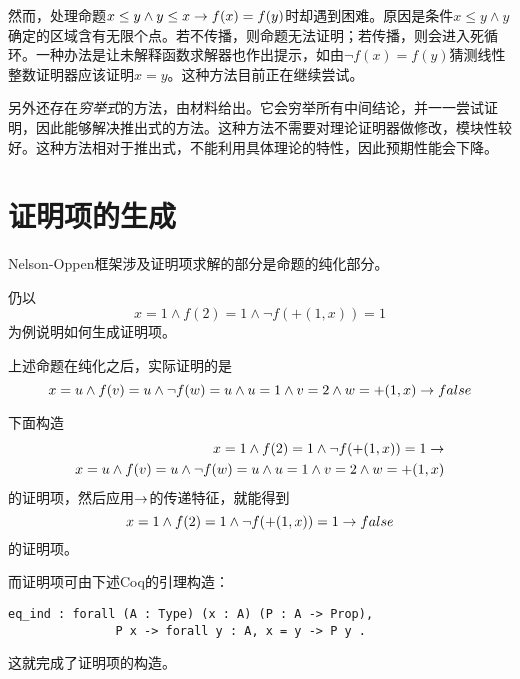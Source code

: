 然而，处理命题$x \leq y \land y \leq x \rightarrow f(x) = f(y)$时却遇到困难。原因是条件$x \leq y \land y$确定的区域含有无限个点。若不传播，则命题无法证明；若传播，则会进入死循环。一种办法是让未解释函数求解器也作出提示，如由$\lnot f(x) = f(y)$猜测线性整数证明器应该证明$x=y$。这种方法目前正在继续尝试。

另外还存在\emph{穷举式}的方法，由材料\cite{Harrison:2009:HPL:1540610}给出。它会穷举所有中间结论，并一一尝试证明，因此能够解决推出式的方法。这种方法不需要对理论证明器做修改，模块性较好。这种方法相对于推出式，不能利用具体理论的特性，因此预期性能会下降。

\section{证明项的生成}
Nelson-Oppen框架涉及证明项求解的部分是命题的纯化部分。

仍以
$$x = 1 \land f(2) = 1 \land \lnot f(+(1,x))=1$$
为例说明如何生成证明项。

上述命题在纯化之后，实际证明的是
$$x = u \land f(v) = u \land \lnot f(w)=u \land u = 1 \land v = 2 \land w = +(1, x) \rightarrow false$$

下面构造
\begin{align*}
x = 1 \land f(2) = 1 \land \lnot f(+(1,x))=1 \rightarrow \\
x = u \land f(v) = u \land \lnot f(w)=u \land u = 1 \land v = 2 \land w = +(1, x)
\end{align*}
的证明项，然后应用$\rightarrow$的传递特征，就能得到
$$x = 1 \land f(2) = 1 \land \lnot f(+(1,x))=1 \rightarrow false$$
的证明项。

而证明项可由下述Coq的引理构造：
\begin{verbatim}
eq_ind : forall (A : Type) (x : A) (P : A -> Prop),
               P x -> forall y : A, x = y -> P y .
\end{verbatim}

这就完成了证明项的构造。
